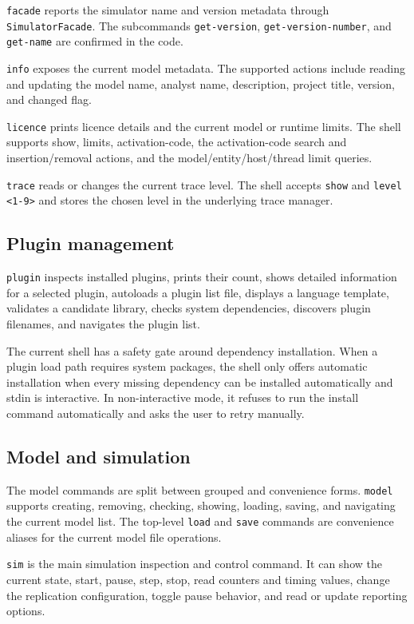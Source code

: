\texttt{facade} reports the simulator name and version metadata through
\texttt{SimulatorFacade}. The subcommands \texttt{get-version},
\texttt{get-version-number}, and \texttt{get-name} are confirmed in the code.

\texttt{info} exposes the current model metadata. The supported actions include
reading and updating the model name, analyst name, description, project
title, version, and changed flag.

\texttt{licence} prints licence details and the current model or runtime
limits. The shell supports show, limits, activation-code, the activation-code
search and insertion/removal actions, and the model/entity/host/thread limit
queries.

\texttt{trace} reads or changes the current trace level. The shell accepts
\texttt{show} and \texttt{level <1-9>} and stores the chosen level in the
underlying trace manager.

\subsection{Plugin management}
\label{subsec:shell-plugins}

\texttt{plugin} inspects installed plugins, prints their count, shows detailed
information for a selected plugin, autoloads a plugin list file, displays a
language template, validates a candidate library, checks system dependencies,
discovers plugin filenames, and navigates the plugin list.

The current shell has a safety gate around dependency installation. When a
plugin load path requires system packages, the shell only offers automatic
installation when every missing dependency can be installed automatically and
stdin is interactive. In non-interactive mode, it refuses to run the install
command automatically and asks the user to retry manually.

\subsection{Model and simulation}
\label{subsec:shell-model-simulation}

The model commands are split between grouped and convenience forms.
\texttt{model} supports creating, removing, checking, showing, loading, saving,
and navigating the current model list. The top-level \texttt{load} and
\texttt{save} commands are convenience aliases for the current model file
operations.

\texttt{sim} is the main simulation inspection and control command. It can
show the current state, start, pause, step, stop, read counters and timing
values, change the replication configuration, toggle pause behavior, and read
or update reporting options.


